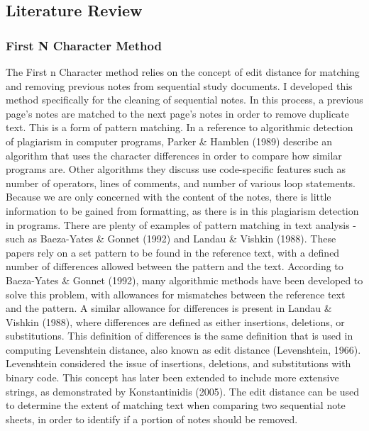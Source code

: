 \documentclass[print]{nuthesis}
\begin{document}
\hypertarget{literature-review}{%
\subsection{Literature Review}\label{literature-review}}

\hypertarget{first-n-character-method}{%
\subsubsection{First N Character Method}\label{first-n-character-method}}

The First n Character method relies on the concept of edit distance for matching and removing previous notes from sequential study documents.
I developed this method specifically for the cleaning of sequential notes.
In this process, a previous page's notes are matched to the next page's notes in order to remove duplicate text.
This is a form of pattern matching.
In a reference to algorithmic detection of plagiarism in computer programs, Parker \& Hamblen (1989) describe an algorithm that uses the character differences in order to compare how similar programs are.
Other algorithms they discuss use code-specific features such as number of operators, lines of comments, and number of various loop statements.
Because we are only concerned with the content of the notes, there is little information to be gained from formatting, as there is in this plagiarism detection in programs.
There are plenty of examples of pattern matching in text analysis - such as Baeza-Yates \& Gonnet (1992) and Landau \& Vishkin (1988).
These papers rely on a set pattern to be found in the reference text, with a defined number of differences allowed between the pattern and the text.
According to Baeza-Yates \& Gonnet (1992), many algorithmic methods have been developed to solve this problem, with allowances for mismatches between the reference text and the pattern.
A similar allowance for differences is present in Landau \& Vishkin (1988), where differences are defined as either insertions, deletions, or substitutions.
This definition of differences is the same definition that is used in computing Levenshtein distance, also known as edit distance (Levenshtein, 1966).
Levenshtein considered the issue of insertions, deletions, and substitutions with binary code.
This concept has later been extended to include more extensive strings, as demonstrated by Konstantinidis (2005).
The edit distance can be used to determine the extent of matching text when comparing two sequential note sheets, in order to identify if a portion of notes should be removed.
\end{document}
